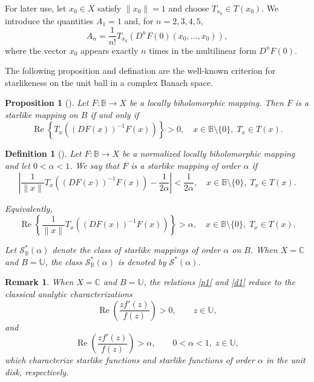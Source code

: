 \documentclass[11pt, reqno]{amsart}
\newtheorem{prop}{Proposition}[section]
\newtheorem{defi}{Definition}[section]
\newtheorem{rem}{Remark}[section]
\numberwithin{equation}{section}
\begin{document}
For later use, let $x_0\in X$ satisfy $\|x_0\|=1$ and choose $T_{x_0}\in T(x_0)$. We introduce the quantities $A_1=1$
and, for $n=2,3,4,5$,
\begin{equation}\label{eq:An}
A_n=\frac{1}{n!}T_{x_0}\left(D^nF(0)(x_0,\ldots,x_0)
\right),
\end{equation}
where the vector $x_0$ appears exactly $n$ times in the multilinear form $D^nF(0)$.



The following proposition and defination are the well-known criterion for starlikeness on the unit
ball in a complex Banach space.

\begin{prop}[{\cite[Proposition 1.1]{Suffridge1973}}]
Let $F : \mathbb{B}\to X$ be a locally biholomorphic mapping. Then $F$ is a starlike mapping on $B$ if and only if
\begin{equation}\label{p1}
\operatorname{Re}\left\{T_x\!\left((DF(x))^{-1}F(x)\right)\right\}>0,
\quad x\in \mathbb{B}\setminus\{0\},\; T_x\in T(x).
\end{equation}
\end{prop}

\begin{defi}[{\cite[Definition 1.2]{HKL2001}}]
Let $F : \mathbb{B}\to X$ be a normalized locally biholomorphic mapping and let
$0<\alpha<1$. We say that $F$ is a \emph{starlike mapping of order $\alpha$} if
\[
\left|
\frac{1}{\|x\|}
T_x\!\left((DF(x))^{-1}F(x)\right)
-\frac{1}{2\alpha}
\right|
<
\frac{1}{2\alpha},
\quad
x\in \mathbb{B}\setminus\{0\},\;
T_x\in T(x).
\]

Equivalently,
\begin{equation}\label{d1}
\operatorname{Re}\left\{
\frac{1}{\|x\|}
T_x\!\left((DF(x))^{-1}F(x)\right)
\right\}
>\alpha,
\quad
x\in \mathbb{B}\setminus\{0\},\;
T_x\in T(x).
\end{equation}

Let $\mathcal{S}_\mathbb{B}^{*}(\alpha)$ denote the class of starlike mappings of order $\alpha$ on $B$.
When $X=\mathbb{C}$ and $B=\mathbb{U}$, the class $\mathcal{S}_\mathbb{B}^{*}(\alpha)$ is denoted by
$\mathcal{S}^{*}(\alpha)$.
\end{defi}

\begin{rem}
When $X=\mathbb{C}$ and $B=\mathbb{U}$, the relations \eqref{p1} and \eqref{d1}
reduce to the classical analytic characterizations
\[
\operatorname{Re}\left(\frac{zf'(z)}{f(z)}\right)>0,
\qquad z\in\mathbb{U},
\]
and
\[
\operatorname{Re}\left(\frac{zf'(z)}{f(z)}\right)>\alpha,
\qquad
0<\alpha<1,\; z\in\mathbb{U},
\]
which characterize starlike functions and starlike functions of order $\alpha$ in the unit disk, respectively.
\end{rem}
\end{document}
